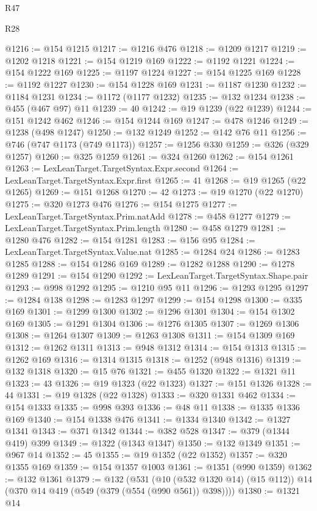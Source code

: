 \begin{lexlean}{R47}
\begin{lexlean}{R28}
\begin{coremodule}
{{{{{{{{{{{{{{{{{{{{{{{{{{{{{{{{{{{{{{{{{{{{{{{{{{{{{{{{{{{{{{{{{{{{{{{{{{{{{{{{{{{{{{{{{{{{{{{{{{{{{{{{{{{{{{{{{{{{{{{{{{{{{{{{{{{{{@1216 := @154 @1215
@1217 := @1216 @476
@1218 := @1209 @1217
@1219 := @1202 @1218
@1221 := @154 @1219 @169
@1222 := @1192 @1221
@1224 := @154 @1222 @169
@1225 := @1197 @1224
@1227 := @154 @1225 @169
@1228 := @1192 @1227
@1230 := @154 @1228 @169
@1231 := @1187 @1230
@1232 := @1184 @1231
@1234 := @1172 (@1177 @1232)
@1235 := @132 @1234
@1238 := @455 (@467 @97) @11
@1239 := 40
@1242 := @19 @1239 (@22 @1239)
@1244 := @151 @1242 @462
@1246 := @154 @1244 @169
@1247 := @478 @1246
@1249 := @1238 (@498 @1247)
@1250 := @132 @1249
@1252 := @142 @76 @11
@1256 := @746 (@747 @1173 (@749 @1173))
@1257 := @1256 @330
@1259 := @326 (@329 @1257)
@1260 := @325 @1259
@1261 := @324 @1260
@1262 := @154 @1261
@1263 := LexLeanTarget.TargetSyntax.Expr.second
@1264 := LexLeanTarget.TargetSyntax.Expr.first
@1265 := 41
@1268 := @19 @1265 (@22 @1265)
@1269 := @151 @1268
@1270 := 42
@1273 := @19 @1270 (@22 @1270)
@1275 := @320 @1273 @476
@1276 := @154 @1275
@1277 := LexLeanTarget.TargetSyntax.Prim.natAdd
@1278 := @458 @1277
@1279 := LexLeanTarget.TargetSyntax.Prim.length
@1280 := @458 @1279
@1281 := @1280 @476
@1282 := @154 @1281
@1283 := @156 @95
@1284 := LexLeanTarget.TargetSyntax.Value.nat
@1285 := @1284 @24
@1286 := @1283 @1285
@1288 := @154 @1286 @169
@1289 := @1282 @1288
@1290 := @1278 @1289
@1291 := @154 @1290
@1292 := LexLeanTarget.TargetSyntax.Shape.pair
@1293 := @998 @1292
@1295 := @1210 @95 @11
@1296 := @1293 @1295
@1297 := @1284 @138
@1298 := @1283 @1297
@1299 := @154 @1298
@1300 := @335 @169
@1301 := @1299 @1300
@1302 := @1296 @1301
@1304 := @154 @1302 @169
@1305 := @1291 @1304
@1306 := @1276 @1305
@1307 := @1269 @1306
@1308 := @1264 @1307
@1309 := @1263 @1308
@1311 := @154 @1309 @169
@1312 := @1262 @1311
@1313 := @948 @1312
@1314 := @154 @1313
@1315 := @1262 @169
@1316 := @1314 @1315
@1318 := @1252 (@948 @1316)
@1319 := @132 @1318
@1320 := @15 @76
@1321 := @455 @1320
@1322 := @1321 @11
@1323 := 43
@1326 := @19 @1323 (@22 @1323)
@1327 := @151 @1326
@1328 := 44
@1331 := @19 @1328 (@22 @1328)
@1333 := @320 @1331 @462
@1334 := @154 @1333
@1335 := @998 @393
@1336 := @48 @11
@1338 := @1335 @1336 @169
@1340 := @154 @1338 @476
@1341 := @1334 @1340
@1342 := @1327 @1341
@1343 := @371 @1342
@1344 := @382 @528
@1347 := @379 (@1344 @419) @399
@1349 := @1322 (@1343 @1347)
@1350 := @132 @1349
@1351 := @967 @14
@1352 := 45
@1355 := @19 @1352 (@22 @1352)
@1357 := @320 @1355 @169
@1359 := @154 @1357 @1003
@1361 := @1351 (@990 @1359)
@1362 := @132 @1361
@1379 := @132
    (@531
      (@10 (@532 @1320 @14) (@15 @112))
      @14
      (@370 @14 @419 (@549 (@379 (@554 (@990 @561)) @398))))
@1380 := @1321 @14
}}}}}}}}}}}}}}}}}}}}}}}}}}}}}}}}}}}}}}}}}}}}}}}}}}}}}}}}}}}}}}}}}}}}}}}}}}}}}}}}}}}}}}}}}}}}}}}}}}}}}}}}}}}}}}}}}}}}}}}}}}}}}}}}}}}}}
\end{coremodule}
\end{lexlean}
\end{lexlean}
